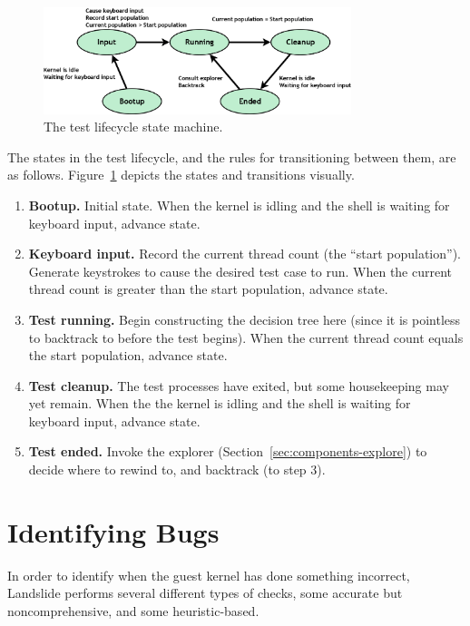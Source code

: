 \begin{figure}[h]
	\begin{center}
		\includegraphics[width=0.8\textwidth]{teststate.png}
	\end{center}
	\caption{The test lifecycle state machine.}
	\label{fig:teststate}
\end{figure}
The states in the test lifecycle, and the rules for transitioning between them, are as follows.
Figure~\ref{fig:teststate} depicts the states and transitions visually.

\begin{enumerate}
	\item {\bf Bootup.} Initial state. When the kernel is idling and the shell is waiting for keyboard input, advance state.
	\item {\bf Keyboard input.} Record the current thread count (the ``start population''). Generate keystrokes to cause the desired test case to run.
		When the current thread count is greater than the start population, advance state.
	\item {\bf Test running.} Begin constructing the decision tree here (since it is pointless to backtrack to before the test begins). When the current thread count equals the start population, advance state.
	\item {\bf Test cleanup.} The test processes have exited, but some housekeeping may yet remain. When the the kernel is idling and the shell is waiting for keyboard input, advance state.
	\item {\bf Test ended.} Invoke the explorer (Section~\ref{sec:components-explore}) to decide where to rewind to, and backtrack (to step 3).
\end{enumerate}

\section{Identifying Bugs}
\label{sec:techniques-bugs}

In order to identify when the guest kernel has done something incorrect, Landslide performs several different types of checks, some accurate but noncomprehensive, and some heuristic-based.

